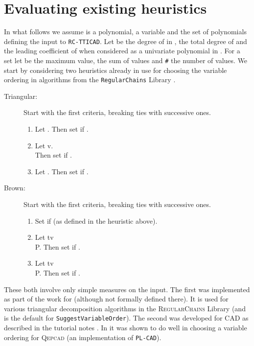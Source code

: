 \documentclass[runningheads,a4paper]{llncs}
\begin{document}
\section{Evaluating existing heuristics}
\label{SEC:Existing}



In what follows we assume  is a polynomial,  a variable and  the set of polynomials defining the input to \texttt{RC-TTICAD}.  Let  be the degree of  in ,  the total degree of  and  the leading coefficient of  when considered as a univariate polynomial in .  For a set let  be the maximum value,  the sum of values and \texttt{\#} the number of values. 
We start by considering two heuristics already in use for choosing the variable ordering in algorithms from the \texttt{RegularChains} Library \cite{RC}.
\begin{description}
\item[Triangular:]  Start with the first criteria, breaking ties with successive ones.
\begin{enumerate}
\item Let .  
Then set  if .
\item Let v.  \\
Then set  if .
\item Let . 
Then set  if .
\end{enumerate}
\item[Brown:] Start with the first criteria, breaking ties with successive ones.
\begin{enumerate}
\item Set  if  (as defined in the heuristic above).
\item Let tv \\ P.  
Then set  if .
\item Let tv \\
P.  
Then set  if .
\end{enumerate}
\end{description}
These both involve only simple measures on the input.  The first was implemented as part of the work for \cite{CDLMXXX11} (although not formally defined there).  It is used for various triangular decomposition algorithms in the \textsc{RegularChains} Library (and is the default for \texttt{SuggestVariableOrder}). The second was developed for CAD as described in the tutorial notes \cite{Brown2004}.  In \cite{HEWDPB14} it was shown to do well in choosing a variable ordering for \textsc{Qepcad} (an implementation of \texttt{PL-CAD}). 
\end{document}
